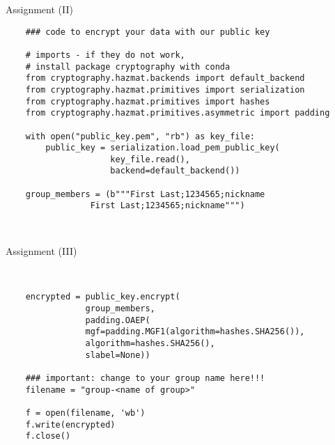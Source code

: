 \begin{frame}[fragile]{Assignment (II)}
	
	\begin{verbatim}
	### code to encrypt your data with our public key
	
	# imports - if they do not work,
	# install package cryptography with conda
	from cryptography.hazmat.backends import default_backend
	from cryptography.hazmat.primitives import serialization
	from cryptography.hazmat.primitives import hashes
	from cryptography.hazmat.primitives.asymmetric import padding
	
	with open("public_key.pem", "rb") as key_file:
	    public_key = serialization.load_pem_public_key(
	                 key_file.read(),
	                 backend=default_backend())
		
	group_members = (b"""First Last;1234565;nickname
                 First Last;1234565;nickname""")
	
	
	\end{verbatim}
	
\end{frame}

\begin{frame}[fragile]{Assignment (III)}
	
	\begin{verbatim}
	
	
	encrypted = public_key.encrypt(
                group_members,
                padding.OAEP(
                mgf=padding.MGF1(algorithm=hashes.SHA256()),
                algorithm=hashes.SHA256(),
                slabel=None))
	
	### important: change to your group name here!!!
	filename = "group-<name of group>"
	
	f = open(filename, 'wb')
	f.write(encrypted)
	f.close()
	\end{verbatim}
	
	\end{frame}



